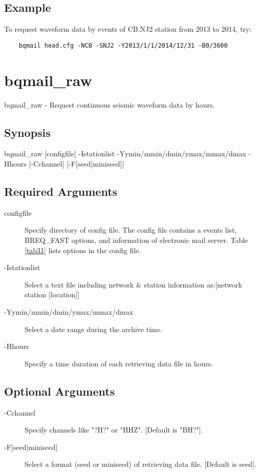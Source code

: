 \documentclass[12pt, a4paper]{report}
\begin{document}
\subsection{Example}
To request waveform data by events of CB.NJ2 station from 2013 to 2014, try:
\begin{lstlisting}
	bqmail head.cfg -NCB -SNJ2 -Y2013/1/1/2014/12/31 -B0/3600 
\end{lstlisting} 

\section{bqmail\_raw}
bqmail\_raw - Request continuous seismic waveform data by hours.
\subsection{Synopsis}
{\tb bqmail\_raw} [{\ti configfile}] {\tb -I}{\ti stationlist} {\tb -Y}{\ti ymin/mmin/dmin/ymax/mmax/dmax} {\tb -H}{\ti hours} [{\tb -C}{\ti channel}] [{\tb -F[{\ti seed}|{\ti miniseed}]}]
\subsection{Required Arguments}
\begin{description}
\item[{\ti configfile}] Specify directory of config file. The config file contains a events list, BREQ\_FAST options, and information of electronic mail server. Table \ref{tab31} lists options in the config file.
\item[{\tb -I}{\ti stationlist}] Select a text file including network \& station information as:[{\ti network station [location]}]
\item[{\tb -Y}{\ti ymin/mmin/dmin/ymax/mmax/dmax}] Select a date range during the archive time.
\item[{\tb -H}{\ti hours}] Specify a time duration of each retrieving data file in hours.
\end{description}
\subsection{Optional Arguments}
\begin{description}
\item[{\tb -C}{\ti channel}] Specify channels like "{\ti ?H?}" or "{\ti HHZ}". [Default is "{\ti BH?}"]. 
\item[{\tb -F[{\ti seed}|{\ti miniseed}]}] Select a format (seed or miniseed) of retrieving data file. [Default is {\ti seed}].
\end{description}
\end{document}
